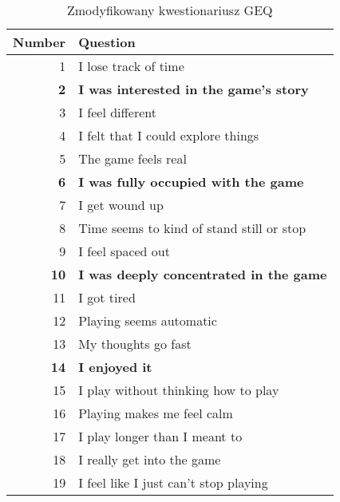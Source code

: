 \begin{table}[ht]
      \begin{center}
            \begin{tabular}{|r | l|}
                  \hline
                  Number      & Question                                       \\
                  \hline
                  1           & I lose track of time                           \\
                  \textbf{2}  & \textbf{I was interested in the game's story}  \\
                  3           & I feel different                               \\
                  4           & I felt that I could explore things             \\
                  5           & The game feels real                            \\
                  \textbf{6}  & \textbf{I was fully occupied with the game}    \\
                  7           & I get wound up                                 \\
                  8           & Time seems to kind of stand still or stop      \\
                  9           & I feel spaced out                              \\
                  \textbf{10} & \textbf{I was deeply concentrated in the game} \\
                  11          & I got tired\footnotemark{}                     \\
                  12          & Playing seems automatic                        \\
                  13          & My thoughts go fast                            \\
                  \textbf{14} & \textbf{I enjoyed it}                          \\
                  15          & I play without thinking how to play            \\
                  16          & Playing makes me feel calm                     \\
                  17          & I play longer than I meant to                  \\
                  18          & I really get into the game                     \\
                  19          & I feel like I just can't stop playing          \\
                  \hline
            \end{tabular}
      \end{center}
      \caption{Zmodyfikowany kwestionariusz GEQ}\label{tab1:ch5_2}
\end{table}

